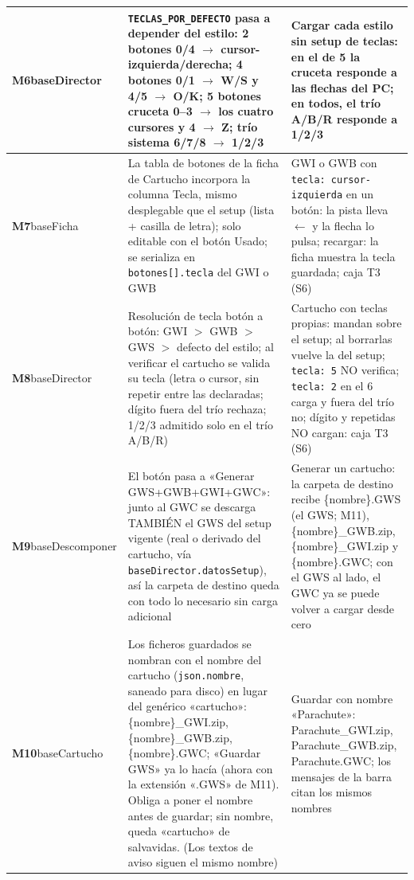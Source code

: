 \begin{xltabular}{\textwidth}{>{\RaggedRight\arraybackslash}p{3cm} >{\RaggedRight\arraybackslash{}\hsize}X >{\RaggedRight\arraybackslash{}\hsize}X}
	\midrule
	\textbf{M6}\newline baseDirector & \texttt{TECLAS\_POR\_DEFECTO} pasa a depender del estilo: 2 botones 0/4 $\to$ cursor-izquierda/derecha; 4 botones 0/1 $\to$ W/S y 4/5 $\to$ O/K; 5 botones cruceta 0--3 $\to$ los cuatro cursores y 4 $\to$ Z; trío sistema 6/7/8 $\to$ 1/2/3 & Cargar cada estilo sin setup de teclas: en el de 5 la cruceta responde a las flechas del PC; en todos, el trío A/B/R responde a 1/2/3 \\
	\midrule
	\textbf{M7}\newline baseFicha & La tabla de botones de la ficha de Cartucho incorpora la columna Tecla, mismo desplegable que el setup (lista + casilla de letra); solo editable con el botón Usado; se serializa en \texttt{botones[].tecla} del GWI o GWB & GWI o GWB con \texttt{tecla:  cursor-izquierda} en un botón: la pista lleva $\leftarrow$ y la flecha lo pulsa; recargar: la ficha muestra la tecla guardada; caja T3 (S6) \\
	\midrule
	\textbf{M8}\newline baseDirector & Resolución de tecla botón a botón: GWI $>$ GWB $>$ GWS $>$ defecto del estilo; al verificar el cartucho se valida su tecla (letra o cursor, sin repetir entre las declaradas; dígito fuera del trío rechaza; 1/2/3 admitido solo en el trío A/B/R) & Cartucho con teclas propias: mandan sobre el setup; al borrarlas vuelve la del setup; \texttt{tecla:  5} NO verifica; \texttt{tecla:  2} en el 6 carga y fuera del trío no; dígito y repetidas NO cargan: caja T3 (S6) \\
	\midrule
	\textbf{M9}\newline baseDescomponer & El botón pasa a «Generar GWS+GWB+GWI+GWC»: junto al GWC se descarga TAMBIÉN el GWS del setup vigente (real o derivado del cartucho, vía \texttt{baseDirector.datosSetup}), así la carpeta de destino queda con todo lo necesario sin carga adicional & Generar un cartucho: la carpeta de destino recibe \{nombre\}.GWS (el GWS; M11), \{nombre\}\_GWB.zip, \{nombre\}\_GWI.zip y \{nombre\}.GWC; con el GWS al lado, el GWC ya se puede volver a cargar desde cero \\
	\midrule
	\textbf{M10}\newline baseCartucho & Los ficheros guardados se nombran con el nombre del cartucho (\texttt{json.nombre}, saneado para disco) en lugar del genérico «cartucho»: \{nombre\}\_GWI.zip, \{nombre\}\_GWB.zip, \{nombre\}.GWC; «Guardar GWS» ya lo hacía (ahora con la extensión «.GWS» de M11). Obliga a poner el nombre antes de guardar; sin nombre, queda «cartucho» de salvavidas. (Los textos de aviso siguen el mismo nombre) & Guardar con nombre «Parachute»: Parachute\_GWI.zip, Parachute\_GWB.zip, Parachute.GWC; los mensajes de la barra citan los mismos nombres \\

\end{xltabular}
